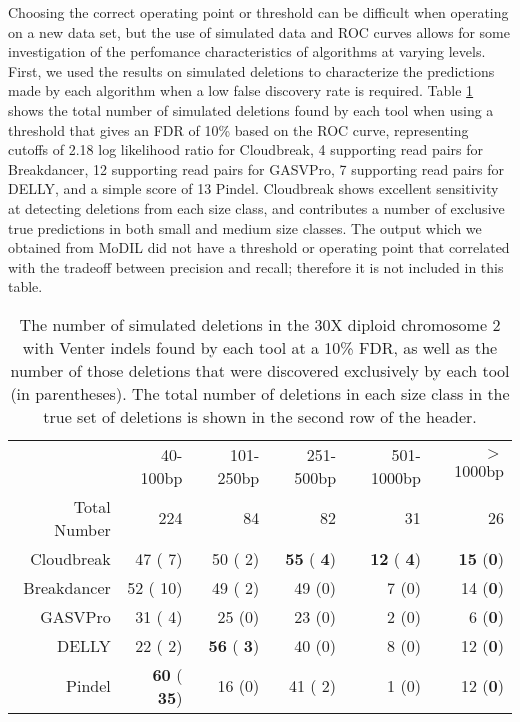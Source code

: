 \documentclass[11pt]{article}
\begin{document}
Choosing the correct operating point or threshold can be difficult when operating on a new data set, but the use of simulated data and ROC curves allows for some investigation of the perfomance characteristics of algorithms at varying levels. First, we used the results on simulated deletions to characterize the predictions made by each algorithm when a low false discovery rate is required. Table \ref{chr2DeletionPredsFDR10} shows the total number of simulated deletions found by each tool when using a threshold that gives an FDR of 10\% based on the ROC curve, representing cutoffs of 2.18 log likelihood ratio for Cloudbreak, 4 supporting read pairs for Breakdancer, 12 supporting read pairs for GASVPro, 7 supporting read pairs for DELLY, and a simple score of 13 Pindel. Cloudbreak shows excellent sensitivity at detecting deletions from each size class, and contributes a number of exclusive true predictions in both small and medium size classes. The output which we obtained from MoDIL did not have a threshold or operating point that correlated with the tradeoff between precision and recall; therefore it is not included in this table.

\begin{table}[t]
\begin{center}
\begin{tabular}{rrrrrr}
  \hline
 & 40-100bp  & 101-250bp  & 251-500bp & 501-1000bp & $>$ 1000bp \\ 
 Total Number & 224 &  84 & 82 &  31 & 26\\ 
  \hline
  Cloudbreak  &   47 (   7)  &   50 (   2) &  \textbf{  55} (\textbf{   4}) & \textbf{  12} (\textbf{   4}) & \textbf{  15} (\textbf{0}) \\ 
  Breakdancer &   52 (  10)  &   49 (   2) &    49 (0) &    7 (0) &   14 (\textbf{0}) \\ 
  GASVPro     &   31 (   4)  &   25 (0) &    23 (0) &    2 (0) &    6 (\textbf{0}) \\ 
  DELLY       &   22 (   2)  & \textbf{  56} (\textbf{   3}) &    40 (0) &    8 (0) &   12 (\textbf{0}) \\ 
  Pindel      & \textbf{  60} (\textbf{  35})  &   16 (0) &    41 (   2) &    1 (0) &   12 (\textbf{0})\\ 
   \hline
\end{tabular}
\end{center}
\caption{The number of simulated deletions in the 30X diploid chromosome 2 with Venter indels found by each tool at a 10\% FDR, as well as the number of those deletions that were discovered exclusively by each tool (in parentheses). The total number of deletions in each size class in the true set of deletions is shown in the second row of the header.}
\label{chr2DeletionPredsFDR10}
\end{table}
\end{document}
